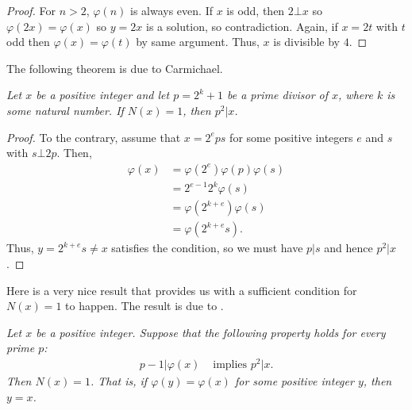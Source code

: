 \documentclass{subfile}
\begin{document}
		\begin{proof}
			For $n>2$, $\varphi(n)$ is always even. If $x$ is odd, then $2\bot x$ so $\varphi(2x)=\varphi(x)$ so $y=2x$ is a solution, so contradiction. Again, if $x=2t$ with $t$ odd then $\varphi(x)=\varphi(t)$ by same argument. Thus, $x$ is divisible by $4$.
		\end{proof}
	The following theorem is due to Carmichael.
	
		\begin{theorem} \slshape
			Let $x$ be a positive integer and let $p=2^k+1$ be a prime divisor of $x$, where $k$ is some natural number. If $N(x)=1$, then $p^2|x$.
		\end{theorem}
		
		\begin{proof}
			To the contrary, assume that $x=2^eps$ for some positive integers $e$ and $s$ with $s\bot 2p$. Then,
				\begin{align*}
					\varphi(x)  & = \varphi(2^e)\varphi(p)\varphi(s)\\
							& = 2^{e-1}2^k\varphi(s)\\
							& = \varphi(2^{k+e})\varphi(s)\\
							& = \varphi(2^{k+e}s).
				\end{align*}
			Thus, $y=2^{k+e}s\neq x$ satisfies the condition, so we must have $p|s$ and hence $p^2 | x$.
		\end{proof}
	Here is a very nice result that provides us with a sufficient condition for $N(x)=1$ to happen. The result is due to \textcite{pomerance_1974}.
		\begin{theorem}\slshape
			 Let $x$ be a positive integer. Suppose that the following property holds for every prime $p$:
				\begin{align*}
					p-1|\varphi(x)& \text{ implies } p^2|x.
				\end{align*}
			Then $N(x)=1$. That is, if $\varphi(y)=\varphi(x)$ for some positive integer $y$, then $y=x$.
		\end{theorem}
		
\end{document}
